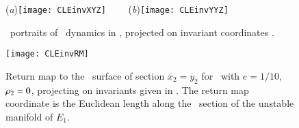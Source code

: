\begin{figure}[ht]
\begin{center}
  (\textit{a})\texttt{[image: CLEinvXYZ]}
~~~~(\textit{b})\texttt{[image: CLEinvYYZ]}
\end{center}
\caption{
\Statesp\ portraits of \cLe\ dynamics  in \reducedsp,
projected on invariant coordinates .
    }
\label{fig:CLEinv}
\end{figure}

\begin{figure}[ht]
\begin{center}
\texttt{[image: CLEinvRM]}
\end{center}
\caption[Return map for Complex Lorenz flow]{
Return map to the \Poincare\ surface of section
$\overline{x}_2=\overline{y}_2$ for \cLe\ with $e=1/10$,
$\rho_2=0$, projecting on invariants given in
. The return map coordinate is the
Euclidean length along the \Poincare\ section of the unstable
manifold of $E_1$.
    }
\label{fig:CLEinvRM}
\end{figure}





